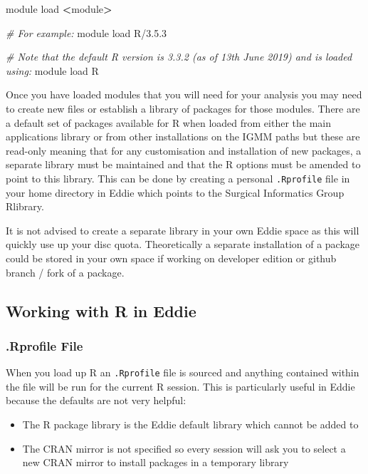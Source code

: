 \documentclass[]{book}
\newenvironment{Shaded}{\begin{snugshade}}{\end{snugshade}}
\newcommand{\CommentTok}[1]{\textcolor[rgb]{0.56,0.35,0.01}{\textit{#1}}}
\newcommand{\ExtensionTok}[1]{#1}
\newcommand{\NormalTok}[1]{#1}
\newcommand{\OperatorTok}[1]{\textcolor[rgb]{0.81,0.36,0.00}{\textbf{#1}}}
\providecommand{\tightlist}{%
  \setlength{\itemsep}{0pt}\setlength{\parskip}{0pt}}
\begin{document}
\begin{Shaded}
\begin{Highlighting}[]
\ExtensionTok{module}\NormalTok{ load }\OperatorTok{<}\NormalTok{module}\OperatorTok{>}

\CommentTok{# For example:}
\ExtensionTok{module}\NormalTok{ load R/3.5.3}

\CommentTok{# Note that the default R version is 3.3.2 (as of 13th June 2019) and is loaded using:}
\ExtensionTok{module}\NormalTok{ load R}
\end{Highlighting}
\end{Shaded}

Once you have loaded modules that you will need for your analysis you may need to create new files or establish a library of packages for those modules. There are a default set of packages available for R when loaded from either the main applications library or from other installations on the IGMM paths but these are read-only meaning that for any customisation and installation of new packages, a separate library must be maintained and that the R options must be amended to point to this library. This can be done by creating a personal \texttt{.Rprofile} file in your home directory in Eddie which points to the Surgical Informatics Group Rlibrary.

It is not advised to create a separate library in your own Eddie space as this will quickly use up your disc quota. Theoretically a separate installation of a package could be stored in your own space if working on developer edition or github branch / fork of a package.

\hypertarget{working-with-r-in-eddie}{%
\subsection{Working with R in Eddie}\label{working-with-r-in-eddie}}

\hypertarget{rprofile-file}{%
\subsubsection{.Rprofile File}\label{rprofile-file}}

When you load up R an \texttt{.Rprofile} file is sourced and anything contained within the file will be run for the current R session. This is particularly useful in Eddie because the defaults are not very helpful:

\begin{itemize}
\tightlist
\item
  The R package library is the Eddie default library which cannot be added to
\item
  The CRAN mirror is not specified so every session will ask you to select a new CRAN mirror to install packages in a temporary library
\end{itemize}
\end{document}
